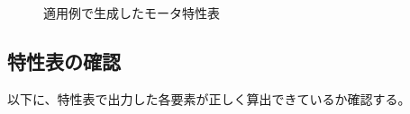 \begin{figure}[t]
	\centering
	\caption{適用例で生成したモータ特性表}
	\label{fig:tekiyou_mortoku}
\end{figure}
\clearpage
\subsection{特性表の確認}
以下に、特性表で出力した各要素が正しく算出できているか確認する。%

